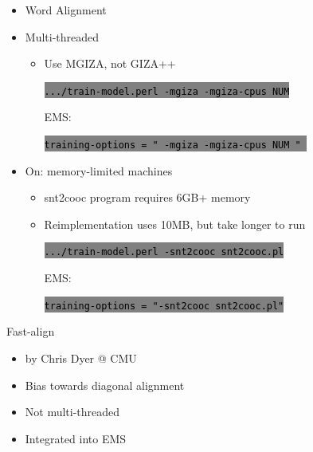 \documentclass[landscape]{uedslides2C}
\newcommand{\littlecode}[1]{\colorbox{gray}{\textcolor{black}{\small \tt #1}}}
\begin{document}


\begin{itemize} \itemsep -1mm

\item {Word Alignment}
\item {Multi-threaded}
  \begin{itemize}
  \item    Use MGIZA, not GIZA++
  \begin{center}
    \littlecode{.../train-model.perl -mgiza -mgiza-cpus NUM} 
  \end{center}      
  EMS: 
  \begin{center}
    \littlecode{training-options = " -mgiza -mgiza-cpus NUM " } 
  \end{center}      
  \end{itemize}

\item {On: memory-limited machines}
  \begin{itemize}
  \item snt2cooc program requires 6GB+ memory
  \item Reimplementation uses 10MB, but take longer to run
  \begin{center}
    \littlecode{.../train-model.perl -snt2cooc snt2cooc.pl} 
  \end{center}      
  EMS:
  \begin{center}
    \littlecode{training-options = "-snt2cooc snt2cooc.pl"}
  \end{center}      

  \end{itemize}
\end{itemize}
       



Fast-align
\begin{itemize} \itemsep -1mm
  \item by Chris Dyer @ CMU
  \item Bias towards diagonal alignment
  \item Not multi-threaded
  \item Integrated into EMS
\end{itemize} 

\end{document}
